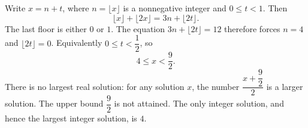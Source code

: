Write $x=n+t$, where $n=\lfloor x\rfloor$ is a nonnegative integer and $0\le t<1$. Then
\[
\lfloor x\rfloor+\lfloor2x\rfloor=3n+\lfloor2t\rfloor.
\]
The last floor is either $0$ or $1$. The equation $3n+\lfloor2t\rfloor=12$ therefore forces $n=4$ and $\lfloor2t\rfloor=0$. Equivalently $0\le t<\dfrac{1}{2}$, so
\[
\boxed{4\le x<\dfrac{9}{2}}.
\]
There is no largest real solution: for any solution $x$, the number $\dfrac{x+\dfrac{9}{2}}{2}$ is a larger solution. The upper bound $\dfrac{9}{2}$ is not attained. The only integer solution, and hence the largest integer solution, is $\boxed{4}$.
